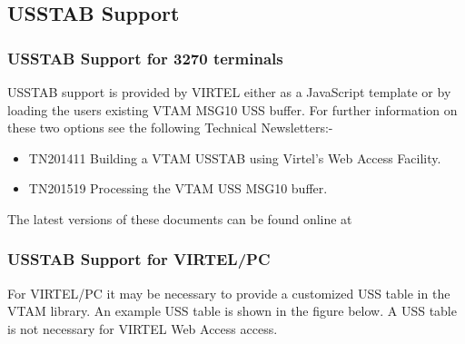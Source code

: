 \documentclass[letterpaper,10pt,english]{sphinxmanual}
\begin{document}


\subsection{USSTAB Support}
\label{\detokenize{Installation_Guide:usstab-support}}\label{\detokenize{Installation_Guide:index-25}}

\subsubsection{USSTAB Support for 3270 terminals}
\label{\detokenize{Installation_Guide:usstab-support-for-3270-terminals}}
USSTAB support is provided by VIRTEL either as a JavaScript template or by loading the users existing VTAM MSG10 USS buffer. For further information on these two options see the following Technical Newsletters:-
\begin{itemize}
\item {} 
TN201411 Building a VTAM USSTAB using Virtel’s Web Access Facility.

\item {} 
TN201519 Processing the VTAM USS MSG10 buffer.

\end{itemize}

The latest versions of these documents can be found online at 


\subsubsection{USSTAB Support for VIRTEL/PC}
\label{\detokenize{Installation_Guide:index-26}}\label{\detokenize{Installation_Guide:usstab-support-for-virtel-pc}}
For VIRTEL/PC it may be necessary to provide a customized USS table in the VTAM library. An example USS table is shown in the figure below. A USS table is not necessary for VIRTEL Web Access access.
\end{document}
